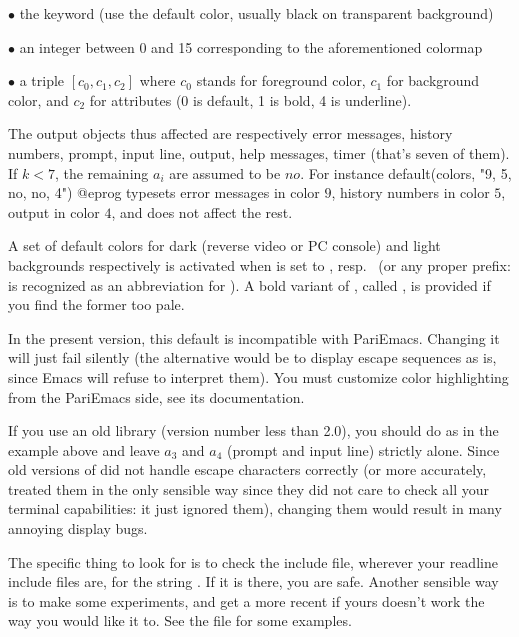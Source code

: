 \noindent $\bullet$ the keyword  (use the default color, usually
black on transparent background)

\noindent $\bullet$ an integer between 0 and 15 corresponding to the
aforementioned colormap

\noindent $\bullet$ a triple $[c_0,c_1,c_2]$ where $c_0$ stands for foreground
color, $c_1$ for background color, and $c_2$ for attributes (0 is default, 1
is bold, 4 is underline).

The output objects thus affected are respectively error messages,
history numbers, prompt, input line, output, help messages, timer (that's
seven of them). If $k < 7$, the remaining $a_i$ are assumed to be $no$. For
instance
%
\bprog
default(colors, "9, 5, no, no, 4")
@eprog
\noindent
typesets error messages in color $9$, history numbers in color $5$, output in
color $4$, and does not affect the rest.

A set of default colors for dark (reverse video or PC console) and light
backgrounds respectively is activated when  is set to
, resp.~ (or any proper prefix:  is
recognized as an abbreviation for ). A bold variant of
, called , is provided if you find the former too
pale.

\emacs In the present version, this default is incompatible with PariEmacs.
Changing it will just fail silently (the alternative would be to display
escape sequences as is, since Emacs will refuse to interpret them).
You must customize color highlighting from the PariEmacs side, see its
documentation.

If you use an old  library (version number less than 2.0),
you should do as in the example above and leave $a_3$ and $a_4$ (prompt
and input line) strictly alone. Since old versions of  did
not handle escape characters correctly (or more accurately, treated them
in the only sensible way since they did not care to check all your terminal
capabilities: it just ignored them), changing them would result in many
annoying display bugs.

The specific thing to look for is to check the  include
file, wherever your readline include files are, for the string
. If it is there, you are safe. Another
sensible way is to make some experiments, and get a more recent
 if yours doesn't work the way you would like it to. See
the file  for some examples.


